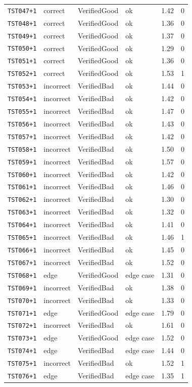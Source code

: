 \begin{longtable}{@{}l l l l r r@{}}
\texttt{TST047{+}1} & correct & VerifiedGood & ok & 1.42 & 0 \\
\texttt{TST048{+}1} & correct & VerifiedGood & ok & 1.36 & 0 \\
\texttt{TST049{+}1} & correct & VerifiedGood & ok & 1.37 & 0 \\
\texttt{TST050{+}1} & correct & VerifiedGood & ok & 1.29 & 0 \\
\texttt{TST051{+}1} & correct & VerifiedGood & ok & 1.36 & 0 \\
\texttt{TST052{+}1} & correct & VerifiedGood & ok & 1.53 & 1 \\
\texttt{TST053{+}1} & incorrect & VerifiedBad & ok & 1.44 & 0 \\
\texttt{TST054{+}1} & incorrect & VerifiedBad & ok & 1.42 & 0 \\
\texttt{TST055{+}1} & incorrect & VerifiedBad & ok & 1.47 & 0 \\
\texttt{TST056{+}1} & incorrect & VerifiedBad & ok & 1.43 & 0 \\
\texttt{TST057{+}1} & incorrect & VerifiedBad & ok & 1.42 & 0 \\
\texttt{TST058{+}1} & incorrect & VerifiedBad & ok & 1.50 & 0 \\
\texttt{TST059{+}1} & incorrect & VerifiedBad & ok & 1.57 & 0 \\
\texttt{TST060{+}1} & incorrect & VerifiedBad & ok & 1.42 & 0 \\
\texttt{TST061{+}1} & incorrect & VerifiedBad & ok & 1.46 & 0 \\
\texttt{TST062{+}1} & incorrect & VerifiedBad & ok & 1.30 & 0 \\
\texttt{TST063{+}1} & incorrect & VerifiedBad & ok & 1.32 & 0 \\
\texttt{TST064{+}1} & incorrect & VerifiedBad & ok & 1.41 & 0 \\
\texttt{TST065{+}1} & incorrect & VerifiedBad & ok & 1.46 & 1 \\
\texttt{TST066{+}1} & incorrect & VerifiedBad & ok & 1.45 & 0 \\
\texttt{TST067{+}1} & incorrect & VerifiedBad & ok & 1.52 & 0 \\
\texttt{TST068{+}1} & edge & VerifiedGood & edge case & 1.31 & 0 \\
\texttt{TST069{+}1} & incorrect & VerifiedBad & ok & 1.38 & 0 \\
\texttt{TST070{+}1} & incorrect & VerifiedBad & ok & 1.33 & 0 \\
\texttt{TST071{+}1} & edge & VerifiedGood & edge case & 1.79 & 0 \\
\texttt{TST072{+}1} & incorrect & VerifiedBad & ok & 1.61 & 0 \\
\texttt{TST073{+}1} & edge & VerifiedGood & edge case & 1.52 & 0 \\
\texttt{TST074{+}1} & edge & VerifiedBad & edge case & 1.44 & 0 \\
\texttt{TST075{+}1} & incorrect & VerifiedBad & ok & 1.52 & 1 \\
\texttt{TST076{+}1} & edge & VerifiedBad & edge case & 1.35 & 1 \\
\end{longtable}
